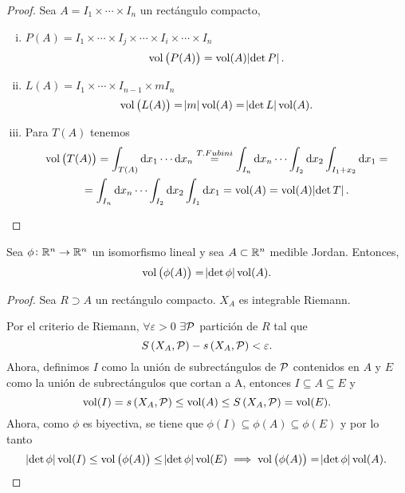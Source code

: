 \begin{proof}
    Sea $A = I_1 \times \cdots \times I_n$ un rectángulo compacto,
    \begin{enumerate}[i)]
        \item $P(A) = I_1 \times \cdots \times I_j \times \cdots \times I_i \times \cdots \times I_n$
            \[
                \operatorname{vol}\left( P(A) \right) = \operatorname{vol}(A) \abs{\det P}.
            \]
        \item $L(A) = I_1 \times \cdots \times I_{n-1} \times mI_n$
            \[
                \operatorname{vol}\left( L(A) \right) = \abs{m} \operatorname{vol}(A) = \abs{\det L} \operatorname{vol}(A).
            \]
        \item Para $T(A)$ tenemos
            \begin{gather*}
                \vol\left( T(A) \right) = \int_{T(A)} \dif x_1 \cdots \dif x_n \stackrel{T.Fubini}{=}
                \int_{I_n} \dif x_n \cdots \int_{I_2} \dif x_2 \int_{I_1 + x_2} \dif x_1 = \\ =
                \int_{I_n} \dif x_n \cdots \int_{I_2} \dif x_2 \int_{I_1} \dif x_1 = \vol(A) = \vol(A) \abs{\det T}.
            \end{gather*} 
    \end{enumerate}
\end{proof}

\begin{lema}[(2)]\label{lema:dos_cambio}
    Sea $\phi \colon \mathbb{R}^n \to \mathbb{R}^n$ un isomorfismo lineal y sea $A \subset \mathbb{R}^n$ medible Jordan.
    Entonces,
    \[
        \operatorname{vol}\left( \phi(A) \right) = \abs{\det \phi} \operatorname{vol}(A).
    \]
\end{lema}

\begin{proof}
    Sea $R \supset A$ un rectángulo compacto. $X_A$ es integrable Riemann.

    Por el criterio de Riemann, $\forall \varepsilon > 0$ $\exists \mathcal{P}$ partición de $R$ tal que
    \[
        S\left( X_A, \mathcal{P} \right) - s\left( X_A, \mathcal{P} \right) < \varepsilon.
    \]
    Ahora, definimos $I$ como la unión de subrectángulos de $\mathcal{P}$ contenidos en $A$ y $E$ como la unión de subrectángulos
    que cortan a A, entonces $I \subseteq A \subseteq E$ y
    \[
        \operatorname{vol}(I) = s\left( X_A, \mathcal{P} \right) \leq \operatorname{vol}(A) \leq S\left( X_A, \mathcal{P} \right) = \operatorname{vol}(E).
    \]
    Ahora, como $\phi$ es biyectiva, se tiene que $\phi(I) \subseteq \phi(A) \subseteq \phi(E)$ y por lo tanto
    \[
        \abs{\det\phi} \operatorname{vol}(I) \leq \operatorname{vol}\left( \phi(A) \right) \leq \abs{\det\phi} \operatorname{vol}(E) \implies
        \operatorname{vol}\left( \phi(A) \right) = \abs{\det \phi} \operatorname{vol}(A).
    \]
\end{proof}

